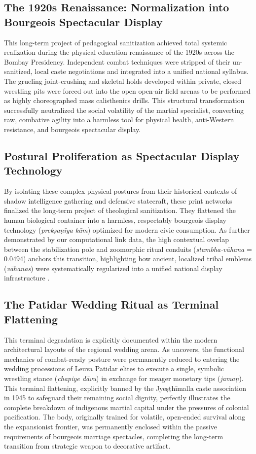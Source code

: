 \documentclass[11pt,twoside,letterpaper]{article}
\begin{document}
\subsection{The 1920s Renaissance: Normalization into Bourgeois Spectacular Display}
This long-term project of pedagogical sanitization achieved total systemic realization during the physical education renaissance of the 1920s across the Bombay Presidency. Independent combat techniques were stripped of their un-sanitized, local caste negotiations and integrated into a unified national syllabus. The grueling joint-crushing and skeletal holds developed within private, closed wrestling pits were forced out into the open open-air field arenas to be performed as highly choreographed mass calisthenics drills. This structural transformation successfully neutralized the social volatility of the martial specialist, converting raw, combative agility into a harmless tool for physical health, anti-Western resistance, and bourgeois spectacular display.

\subsection{Postural Proliferation as Spectacular Display Technology}
By isolating these complex physical postures from their historical contexts of shadow intelligence gathering and defensive statecraft, these print networks finalized the long-term project of theological sanitization. They flattened the human biological container into a harmless, respectably bourgeois display technology (\textit{prekṣaṇīya kām}) optimized for modern civic consumption. As further demonstrated by our computational link data, the high contextual overlap between the stabilization pole and zoomorphic ritual conduits (\textit{stambha-vāhana} = $0.0494$) anchors this transition, highlighting how ancient, localized tribal emblems (\textit{vāhanas}) were systematically regularized into a unified national display infrastructure \citep{Abbasi2001}.

\subsection{The Patidar Wedding Ritual as Terminal Flattening}
This terminal degradation is explicitly documented within the modern architectural layouts of the regional wedding arena. As \citet{Sandesara1948} uncovers, the functional mechanics of combat-ready posture were permanently reduced to entering the wedding processions of Leuva Patidar elites to execute a single, symbolic wrestling stance (\textit{chapiye dāvu}) in exchange for meager monetary tips (\textit{jamaṇ}). This terminal flattening, explicitly banned by the Jyeṣṭhīmalla caste association in 1945 to safeguard their remaining social dignity, perfectly illustrates the complete breakdown of indigenous martial capital under the pressures of colonial pacification. The body, originally trained for volatile, open-ended survival along the expansionist frontier, was permanently enclosed within the passive requirements of bourgeois marriage spectacles, completing the long-term transition from strategic weapon to decorative artifact.
\end{document}
